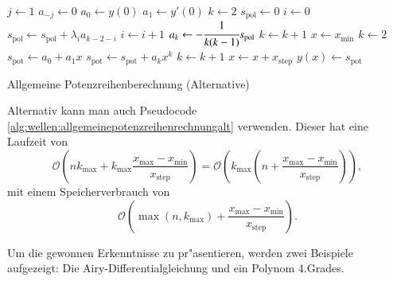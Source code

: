 \begin{algorithm}
	\begin{algorithmic}[1]
		\State $j \gets 1$
			\State $a_{-j} \gets 0$
		\EndFor
		\State $a_0 \gets y(0)$
		\State $a_1 \gets y'(0)$
		\State $k \gets 2$
			\State $s_{\text{pol}} \gets 0$
			\State $i \gets 0$
				\State $s_{\text{pol}} \gets s_{\text{pol}}+\lambda_i a_{k-2-i}$
				\State $i \gets i + 1$
			\EndFor
			\State $a_k \gets -\cfrac{1}{k(k-1)} s_{\text{pol}}$
			\State $k \gets k + 1$
		\EndFor
		\State $x \gets x_{\text{min}}$
			\State $k \gets 2$
			\State $s_{\text{pot}} \gets a_0 + a_1x$
				\State $s_{\text{pot}} \gets s_{\text{pot}} + a_k x^k$
				\State $k \gets k + 1$
			\EndFor
			\State $x \gets x + x_{\text{step}}$
			\State $y(x) \gets s_{\text{pot}}$
		\EndFor
	\end{algorithmic}
	\caption{Allgemeine Potenzreihenberechnung (Alternative)} 
	\label{alg:wellen:allgemeinepotenzreihenrechnungalt}
\end{algorithm}

Alternativ kann man auch Pseudocode 
\ref{alg:wellen:allgemeinepotenzreihenrechnungalt} verwenden. Dieser hat eine 
Laufzeit von
\begin{equation*}
	\mathcal{O}
	\left(
		nk_{\text{max}} + k_{\text{max}} 
		\frac{x_{\text{max}}-x_{\text{min}}}{x_{\text{step}}}
	\right)
	=
	\mathcal{O}
	\left(
		k_{\text{max}}
		\left(
			n+\frac{x_{\text{max}}-x_{\text{min}}}{x_{\text{step}}}
		\right)
	\right),
\end{equation*}
mit einem Speicherverbrauch von
\begin{equation*}
	\mathcal{O}
	\left(
		\max(n, k_{\text{max}}) + 
		\frac{x_{\text{max}}-x_{\text{min}}}{x_{\text{step}}}
	\right).
\end{equation*}

Um die gewonnen Erkenntnisse zu pr"asentieren, werden zwei Beispiele 
aufgezeigt: Die Airy-Differentialgleichung und ein Polynom 4.Grades.